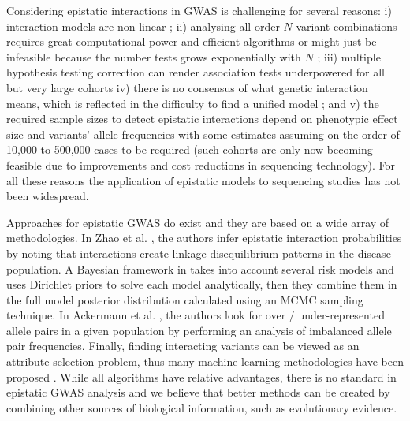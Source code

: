Considering epistatic interactions in GWAS is challenging for several reasons: 
i) interaction models are non-linear \cite{gao2010classification}; 
ii) analysing all order $N$ variant combinations requires great computational power and efficient algorithms or might just be infeasible because the number tests grows exponentially with $N$ \cite{phillips2008epistasis}; 
iii) multiple hypothesis testing correction can render association tests underpowered for all but very large cohorts \cite{gao2010classification, phillips2008epistasis}
iv) there is no consensus of what genetic interaction means, which is reflected in the difficulty to find a unified model \cite{phillips2008epistasis,mani2008defining}; and 
v) the required sample sizes to detect epistatic interactions depend on phenotypic effect size and variants' allele frequencies with some estimates assuming on the order of 10,000 to 500,000 cases \cite{jostins2013using} to be required (such cohorts are only now becoming feasible due to improvements and cost reductions in sequencing technology).
For all these reasons the application of epistatic models to sequencing studies has not been widespread.

Approaches for epistatic GWAS do exist and they are based on a wide array of methodologies. 
In Zhao et al. \cite{zhao2006test}, the authors infer epistatic interaction probabilities by noting that interactions create linkage disequilibrium patterns in the disease population. 
A Bayesian framework in \cite{zhang2007bayesian} takes into account several risk models and uses Dirichlet priors to solve each model analytically, then they combine them in the full model posterior distribution calculated using an MCMC sampling technique. 
In Ackermann et al. \cite{ackermann2012systematic}, the authors look for over / under-represented allele pairs in a given population by performing an analysis of imbalanced allele pair frequencies. 
Finally, finding interacting variants can be viewed as an attribute selection problem, thus many machine learning methodologies have been proposed \cite{mckinney2006machine}. 
While all algorithms have relative advantages, there is no standard in epistatic GWAS analysis and we believe that better methods can be created by combining other sources of biological information, such as evolutionary evidence.

